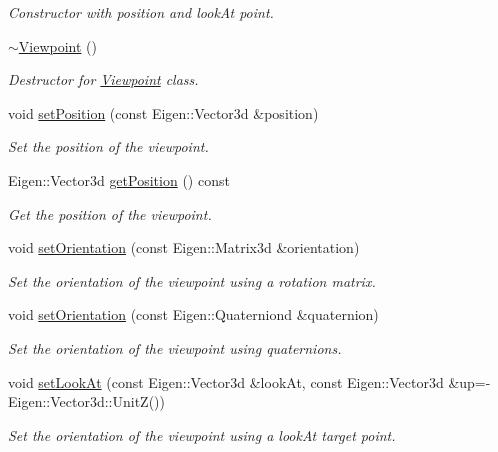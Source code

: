 \begin{DoxyCompactItemize}
\begin{DoxyCompactList}\small\item\em Constructor with position and look\+At point. \end{DoxyCompactList}\item 
\hyperlink{classvisioncraft_1_1Viewpoint_a4964be212cfb22f01f826ea9576030f6}{$\sim$\+Viewpoint} ()
\begin{DoxyCompactList}\small\item\em Destructor for \hyperlink{classvisioncraft_1_1Viewpoint}{Viewpoint} class. \end{DoxyCompactList}\item 
void \hyperlink{classvisioncraft_1_1Viewpoint_acfd98e5627f6c9ca6f55aae9a473621e}{set\+Position} (const Eigen\+::\+Vector3d \&position)
\begin{DoxyCompactList}\small\item\em Set the position of the viewpoint. \end{DoxyCompactList}\item 
Eigen\+::\+Vector3d \hyperlink{classvisioncraft_1_1Viewpoint_a2ee8f324a3ff2f1116d6782a20c042ce}{get\+Position} () const
\begin{DoxyCompactList}\small\item\em Get the position of the viewpoint. \end{DoxyCompactList}\item 
void \hyperlink{classvisioncraft_1_1Viewpoint_adbb30bbbe2e486d403b4fc616b42f58e}{set\+Orientation} (const Eigen\+::\+Matrix3d \&orientation)
\begin{DoxyCompactList}\small\item\em Set the orientation of the viewpoint using a rotation matrix. \end{DoxyCompactList}\item 
void \hyperlink{classvisioncraft_1_1Viewpoint_a681ff114c9fcf0d84f848a70db673e74}{set\+Orientation} (const Eigen\+::\+Quaterniond \&quaternion)
\begin{DoxyCompactList}\small\item\em Set the orientation of the viewpoint using quaternions. \end{DoxyCompactList}\item 
void \hyperlink{classvisioncraft_1_1Viewpoint_ab3245e3767522f4f88cde55bdda58965}{set\+Look\+At} (const Eigen\+::\+Vector3d \&look\+At, const Eigen\+::\+Vector3d \&up=-\/Eigen\+::\+Vector3d\+::\+UnitZ())
\begin{DoxyCompactList}\small\item\em Set the orientation of the viewpoint using a look\+At target point. \end{DoxyCompactList}\item 

\end{DoxyCompactItemize}
